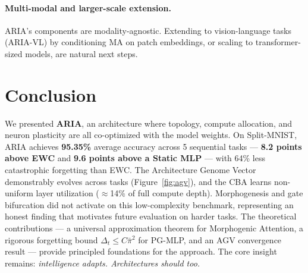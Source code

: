 \documentclass[11pt,a4paper]{article}
\theoremstyle{plain}
\theoremstyle{definition}
\theoremstyle{remark}
\newcommand{\pibar}{\bar{\pi}}
\begin{document}
\paragraph{Multi-modal and larger-scale extension.}
ARIA's components are modality-agnostic. Extending to vision-language tasks (ARIA-VL) by conditioning MA on patch embeddings, or scaling to transformer-sized models, are natural next steps.

\section{Conclusion}

We presented \textbf{ARIA}, an architecture where topology, compute allocation, and neuron plasticity are all co-optimized with the model weights. On Split-MNIST, ARIA achieves \textbf{95.35\%} average accuracy across 5 sequential tasks --- \textbf{8.2 points above EWC} and \textbf{9.6 points above a Static MLP} --- with 64\% less catastrophic forgetting than EWC. The Architecture Genome Vector demonstrably evolves across tasks (Figure~\ref{fig:agv}), and the CBA learns non-uniform layer utilization ($\approx$14\% of full compute depth). Morphogenesis and gate bifurcation did not activate on this low-complexity benchmark, representing an honest finding that motivates future evaluation on harder tasks. The theoretical contributions --- a universal approximation theorem for Morphogenic Attention, a rigorous forgetting bound $\Delta_t \leq C\pibar^2$ for PG-MLP, and an AGV convergence result --- provide principled foundations for the approach. The core insight remains: \emph{intelligence adapts. Architectures should too.}
\end{document}
